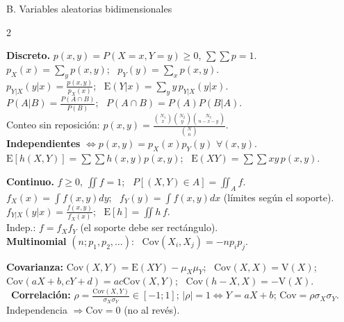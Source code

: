 \documentclass[10pt,a4paper]{extarticle}
\newcommand{\E}{\mathrm{E}}
\newcommand{\V}{\mathrm{V}}
\newcommand{\Cov}{\mathrm{Cov}}
\begin{document}
\begin{hoja}{B. Variables aleatorias bidimensionales}
\begin{multicols}{2}\raggedright
\textbf{Discreto.} $p(x,y)=P(X{=}x,Y{=}y)\ge0$, $\sum\sum p=1$.\\
$p_X(x)=\sum_yp(x,y)$; \ $p_Y(y)=\sum_xp(x,y)$.\\
$p_{Y|X}(y|x)=\frac{p(x,y)}{p_X(x)}$; \ $\E(Y|x)=\sum_yy\,p_{Y|X}(y|x)$.\\
$P(A|B)=\frac{P(A\cap B)}{P(B)}$; \ $P(A\cap B)=P(A)P(B|A)$.\\
Conteo sin reposición: $p(x,y)=\frac{\binom{N_1}x\binom{N_2}y\binom{N_3}{n-x-y}}{\binom Nn}$.\\
\textbf{Independientes} $\iff p(x,y)=p_X(x)p_Y(y)$ $\forall(x,y)$.\\
$\E[h(X,Y)]=\sum\sum h(x,y)p(x,y)$; \ $\E(XY)=\sum\sum xy\,p(x,y)$.

\columnbreak
\textbf{Continuo.} $f\ge0$, $\iint f=1$; \ $P[(X,Y)\in A]=\iint_Af$.\\
$f_X(x)=\int f(x,y)dy$; \ $f_Y(y)=\int f(x,y)dx$ (límites según el soporte).\\
$f_{Y|X}(y|x)=\frac{f(x,y)}{f_X(x)}$; \ $\E[h]=\iint h\,f$.\\
Indep.: $f=f_Xf_Y$ (el soporte debe ser rectángulo).\\
\textbf{Multinomial} $(n;p_1,p_2,\dots)$: \ $\Cov(X_i,X_j)=-np_ip_j$.
\end{multicols}
\vspace{-5pt}
\textbf{Covarianza:} $\Cov(X,Y)=\E(XY)-\mu_X\mu_Y$; \ $\Cov(X,X)=\V(X)$; \ $\Cov(aX+b,cY+d)=ac\Cov(X,Y)$; \ $\Cov(h-X,X)=-\V(X)$.
\ \textbf{Correlación:} $\rho=\frac{\Cov(X,Y)}{\sigma_X\sigma_Y}\in[-1;1]$; $|\rho|=1\iff Y=aX+b$; $\Cov=\rho\sigma_X\sigma_Y$. Independencia $\Rightarrow\Cov=0$ (no al revés).
\end{hoja}
\end{document}
